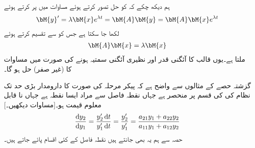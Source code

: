 ہم دیکھ چکے کہ  کو حل تصور کرتے ہوئے مساوات  میں پر کرتے ہوئے
\begin{align*}
\bM{y}'=\lambda \bM{x}e^{\lambda t}=\bM{A}\bM{y}=\bM{A}\bM{x}e^{\lambda t}
\end{align*}
لکھا جا سکتا ہے جس کو  سے تقسیم کرتے ہوئے
\begin{align}\label{مساوات_نظام_جانچ_نقطہ_فاصل_ب}
\bM{A}\bM{x}=\lambda \bM{x}
\end{align}
ملتا ہے۔یوں  قالب   کا آئگنی قدر اور  نظیری آئگنی سمتیہ ہونے کی صورت میں   مساوات  کا (غیر صفر) حل ہو گا۔

گزشتہ حصے کے مثالوں سے واضح ہے کہ پیکر مرحلہ کی صورت کا دارومدار بڑی حد تک نظام  کی  کی قسم پر منحصر ہے جہاں نقطہ فاصل سے مراد ایسا نقطہ ہے جہاں  نا قابل معلوم قیمت  ہو۔[مساوات  دیکھیں۔]
\begin{align}\label{مساوات_نظام_جانچ_نقطہ_فاصل_پ}
\frac{\dif y_2}{\dif y_1}=\frac{y_2' \dif t}{y_1'\dif t}=\frac{y_2'}{y_1'}=\frac{a_{21}y_1+a_{22}y_2}{a_{11}y_1+a_{12}y_2}
\end{align}
حصہ   سے ہم یہ بھی جانتے ہیں نقطہ فاصل کے کئی اقسام پائے جاتے ہیں۔

